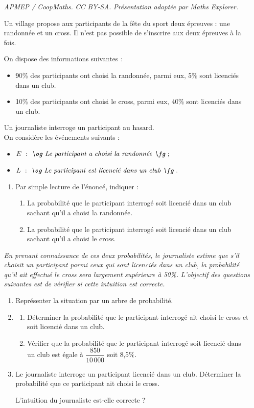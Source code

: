 \documentclass[10pt]{article}
\begin{document}
\noindent\textit{APMEP / CoopMaths. CC BY-SA. Présentation adaptée par Maths Explorer.}\par\medskip
Un village propose aux participants de la fête du sport deux épreuves : une randonnée et un cross. Il n'est pas possible de s'inscrire aux deux épreuves à la fois.

On dispose des informations suivantes :
\begin{itemize}
\item 90\% des participants ont choisi la randonnée, parmi eux, 5\% sont licenciés dans un club.
\item 10\% des participants ont choisi le cross, parmi eux, 40\% sont licenciés dans un club.
\end{itemize}

Un journaliste interroge un participant au hasard. \\
On considère les événements suivants :
\begin{itemize}
\item[] $E~:~\textit{\og Le participant a choisi la randonnée \fg}~;$
\item[] $L~:~\textit{\og Le participant est licencié dans un club \fg}~.$
\end{itemize}

\begin{enumerate}
\item Par simple lecture de l'énoncé, indiquer :
\begin{enumerate}
\item La probabilité que le participant interrogé soit licencié dans un club sachant qu'il a choisi la randonnée.
\item La probabilité que le participant interrogé soit licencié dans un club sachant qu'il a choisi le cross.
\end{enumerate}
\end{enumerate}

\textit{En prenant connaissance de ces deux probabilités, le journaliste estime que s'il choisit un participant parmi ceux qui sont licenciés dans un club, la probabilité qu'il ait effectué le cross sera largement supérieure à 50\%. L'objectif des questions suivantes est de vérifier si cette intuition est correcte.}

\begin{enumerate}[resume]
\item Représenter la situation par un arbre de probabilité.

\item 
\begin{enumerate}
\item Déterminer la probabilité que le participant interrogé ait choisi le cross et soit licencié dans un club.
\item Vérifier que la probabilité que le participant interrogé soit licencié dans un club est égale à $\dfrac{850}{10\,000}$ soit 8,5\%.
\end{enumerate}

\item Le journaliste interroge un participant licencié dans un club. Déterminer la probabilité que ce participant ait choisi le cross.

L'intuition du journaliste est-elle correcte ?
\end{enumerate}
\end{document}
